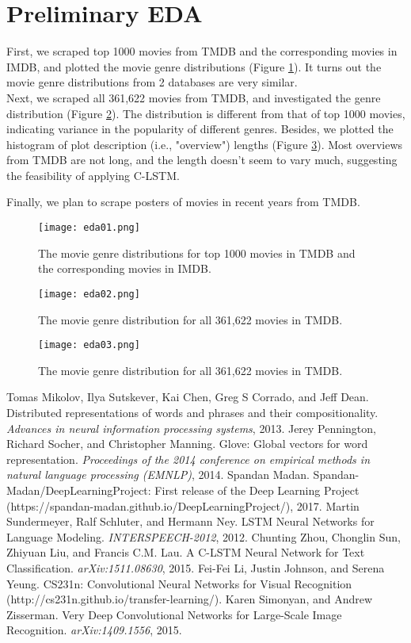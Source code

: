 \documentclass[12pt]{article}
\begin{document}
\section*{Preliminary EDA}
First, we scraped top 1000 movies from TMDB and the corresponding movies in IMDB, and plotted the movie genre distributions (Figure \ref{fig:eda01}). It turns out the movie genre distributions from 2 databases are very similar.\\

\noindent
Next, we scraped all 361,622 movies from TMDB, and investigated the genre distribution (Figure \ref{fig:eda02}). The distribution is different from that of top 1000 movies, indicating variance in the popularity of different genres. Besides, we plotted the histogram of plot description (i.e., "overview") lengths (Figure \ref{fig:eda03}). Most overviews from TMDB are not long, and the length doesn't seem to vary much, suggesting the feasibility of applying C-LSTM.

\noindent
Finally, we plan to scrape posters of movies in recent years from TMDB.

\begin{figure}[H]
\centering
\texttt{[image: eda01.png]}
\caption{\label{fig:eda01}The movie genre distributions for top 1000 movies in TMDB and the corresponding movies in IMDB.}
\end{figure}
\begin{figure}[H]
\centering
\texttt{[image: eda02.png]}
\caption{\label{fig:eda02}The movie genre distribution for all 361,622 movies in TMDB.}
\end{figure}
\begin{figure}[H]
\centering
\texttt{[image: eda03.png]}
\caption{\label{fig:eda03}The movie genre distribution for all 361,622 movies in TMDB.}
\end{figure}

\begin{thebibliography}{9}
 Tomas Mikolov, Ilya Sutskever, Kai Chen, Greg S Corrado, and Jeff Dean. Distributed representations
of words and phrases and their compositionality. \emph{Advances in neural information
processing systems}, 2013.
 Jerey Pennington, Richard Socher, and Christopher Manning. Glove: Global vectors for
word representation. \emph{Proceedings of the 2014 conference on empirical methods in natural language
processing (EMNLP)}, 2014.
 Spandan Madan. Spandan-Madan/DeepLearningProject: First release of the Deep Learning
Project (https://spandan-madan.github.io/DeepLearningProject/), 2017.
 Martin Sundermeyer, Ralf Schluter, and Hermann Ney. LSTM Neural Networks for Language Modeling. \emph{INTERSPEECH-2012}, 2012.
 Chunting Zhou, Chonglin Sun, Zhiyuan Liu, and Francis C.M. Lau. A C-LSTM Neural Network for Text Classification. \emph{arXiv:1511.08630}, 2015.
 Fei-Fei Li, Justin Johnson, and Serena Yeung. CS231n: Convolutional Neural Networks for Visual Recognition (http://cs231n.github.io/transfer-learning/).
 Karen Simonyan, and Andrew Zisserman. Very Deep Convolutional Networks for Large-Scale Image Recognition. \emph{arXiv:1409.1556}, 2015.
\end{thebibliography}
\end{document}
